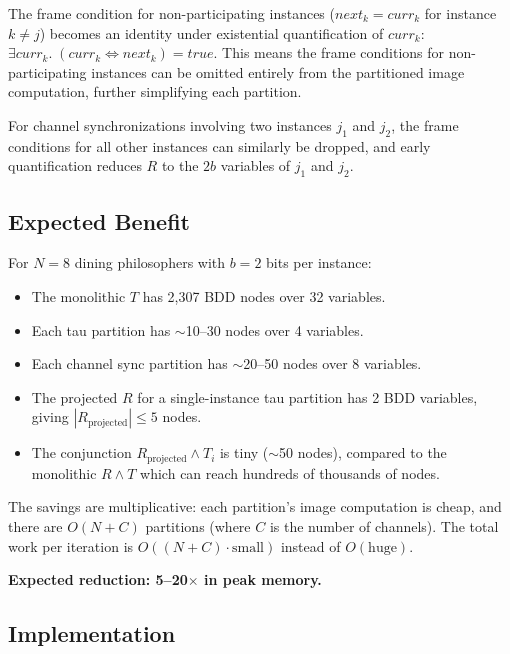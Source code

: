\documentclass[11pt]{article}
\begin{document}
The frame condition for non-participating instances
($\mathit{next}_k = \mathit{curr}_k$ for instance $k \neq j$)
becomes an identity under existential quantification of $\mathit{curr}_k$:
$\exists \mathit{curr}_k.\; (\mathit{curr}_k \Leftrightarrow
\mathit{next}_k) = \mathit{true}$.  This means the frame conditions
for non-participating instances can be omitted entirely from the
partitioned image computation, further simplifying each partition.

For channel synchronizations involving two instances $j_1$ and $j_2$,
the frame conditions for all other instances can similarly be dropped,
and early quantification reduces $R$ to the $2b$ variables of
$j_1$ and $j_2$.

\subsection{Expected Benefit}

For $N = 8$ dining philosophers with $b = 2$ bits per instance:

\begin{itemize}
\item The monolithic $T$ has 2,307 BDD nodes over 32 variables.
\item Each tau partition has $\sim$10--30 nodes over 4 variables.
\item Each channel sync partition has $\sim$20--50 nodes over 8 variables.
\item The projected $R$ for a single-instance tau partition has
  2 BDD variables, giving $|R_{\mathrm{projected}}| \leq 5$ nodes.
\item The conjunction $R_{\mathrm{projected}} \wedge T_i$ is tiny
  ($\sim$50 nodes), compared to the monolithic
  $R \wedge T$ which can reach hundreds of thousands of nodes.
\end{itemize}

The savings are multiplicative: each partition's image computation
is cheap, and there are $O(N + C)$ partitions (where $C$ is the
number of channels).  The total work per iteration is
$O((N + C) \cdot \text{small})$ instead of $O(\text{huge})$.

\textbf{Expected reduction: 5--20$\times$ in peak memory.}

\subsection{Implementation}
\end{document}
